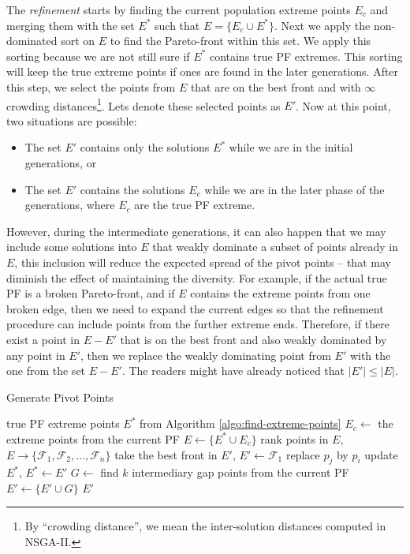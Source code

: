 \documentclass{sig-alternate-05-2015}
\begin{document}
The \textit{refinement} starts by finding the current population extreme points \(E_c\) and merging them with the set \(E^\ast\) such that \(E = \{E_c \cup E^\ast\}\). Next we apply the non-dominated sort on \(E\) to find the Pareto-front within this set. We apply this sorting because we are not still sure if \(E^\ast\) contains true PF extremes. This sorting will keep the true extreme points if ones are found in the later generations. After this step, we select the points from \(E\) that are on the best front and with \(\infty\) crowding distances\footnote{By ``crowding distance'', we mean the inter-solution distances computed in NSGA-II.}. Lets denote these selected points as \(E'\). Now at this point, two situations are possible:
%
\begin{itemize}
	\item The set \(E'\) contains only the solutions \(E^\ast\) while we are in the initial generations, or
	\item The set \(E'\) contains the solutions \(E_c\) while we are in the later phase of the generations, where \(E_c\) are the true PF extreme. 
\end{itemize}
%
However, during the intermediate generations, it can also happen that we may include some solutions into \(E\) that weakly dominate a subset of points already in \(E\), this inclusion will reduce the expected spread of the pivot points -- that may diminish the effect of maintaining the diversity. For example, if the actual true PF is a broken Pareto-front, and if \(E\) contains the extreme points from one broken edge, then we need to expand the current edges so that the refinement procedure can include points from the further extreme ends. Therefore, if there exist a point in \(E - E'\) that is on the best front and also weakly dominated by any point in \(E'\), then we replace the weakly dominating point from \(E'\) with the one from the set \(E - E'\). The readers might have already noticed that \(|E'| \le |E|\).
%
\begin{algorithm}[bp]
\caption{Generate Pivot Points}
\label{algo:generate-pivot-points}
\begin{algorithmic}[1]
	\REQUIRE true PF extreme points $E^{\ast}$ from Algorithm \ref{algo:find-extreme-points}
	\STATE $E_c \leftarrow$ the extreme points from the current PF
	\STATE $E \leftarrow \{E^\ast \cup E_c\}$
	\STATE rank points in $E$, $E \rightarrow \{\mathcal{F}_1, \mathcal{F}_2, \ldots, \mathcal{F}_n\}$
	\STATE take the best front in $E'$, $E' \leftarrow \mathcal{F}_1$
			\STATE replace $p_j$ by $p_i$
		\ENDIF
	\ENDFOR
	\STATE update $E^\ast$, $E^\ast \leftarrow E'$
	\STATE $G \leftarrow$ find $k$ intermediary gap points from the current PF
	\STATE $E' \leftarrow \{E' \cup G\}$
	\RETURN $E'$
\end{algorithmic}
\end{algorithm}
%
\end{document}
